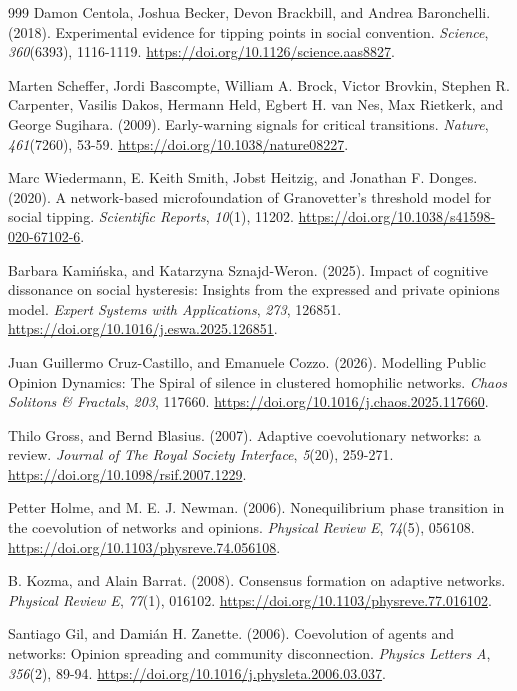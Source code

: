 \documentclass[10pt,a4paper]{article}
\begin{document}
\begin{thebibliography}{999}
Damon Centola, Joshua Becker, Devon Brackbill, and Andrea Baronchelli. (2018). Experimental evidence for tipping points in social convention. \textit{Science}, \textit{360}(6393), 1116-1119. \url{https://doi.org/10.1126/science.aas8827}.

Marten Scheffer, Jordi Bascompte, William A. Brock, Victor Brovkin, Stephen R. Carpenter, Vasilis Dakos, Hermann Held, Egbert H. van Nes, Max Rietkerk, and George Sugihara. (2009). Early-warning signals for critical transitions. \textit{Nature}, \textit{461}(7260), 53-59. \url{https://doi.org/10.1038/nature08227}.

Marc Wiedermann, E. Keith Smith, Jobst Heitzig, and Jonathan F. Donges. (2020). A network-based microfoundation of Granovetter's threshold model for social tipping. \textit{Scientific Reports}, \textit{10}(1), 11202. \url{https://doi.org/10.1038/s41598-020-67102-6}.

Barbara Kami\'{n}ska, and Katarzyna Sznajd-Weron. (2025). Impact of cognitive dissonance on social hysteresis: Insights from the expressed and private opinions model. \textit{Expert Systems with Applications}, \textit{273}, 126851. \url{https://doi.org/10.1016/j.eswa.2025.126851}.

Juan Guillermo Cruz-Castillo, and Emanuele Cozzo. (2026). Modelling Public Opinion Dynamics: The Spiral of silence in clustered homophilic networks. \textit{Chaos Solitons \& Fractals}, \textit{203}, 117660. \url{https://doi.org/10.1016/j.chaos.2025.117660}.

Thilo Gross, and Bernd Blasius. (2007). Adaptive coevolutionary networks: a review. \textit{Journal of The Royal Society Interface}, \textit{5}(20), 259-271. \url{https://doi.org/10.1098/rsif.2007.1229}.

Petter Holme, and M. E. J. Newman. (2006). Nonequilibrium phase transition in the coevolution of networks and opinions. \textit{Physical Review E}, \textit{74}(5), 056108. \url{https://doi.org/10.1103/physreve.74.056108}.

B. Kozma, and Alain Barrat. (2008). Consensus formation on adaptive networks. \textit{Physical Review E}, \textit{77}(1), 016102. \url{https://doi.org/10.1103/physreve.77.016102}.

Santiago Gil, and Dami\'{a}n H. Zanette. (2006). Coevolution of agents and networks: Opinion spreading and community disconnection. \textit{Physics Letters A}, \textit{356}(2), 89-94. \url{https://doi.org/10.1016/j.physleta.2006.03.037}.


\end{thebibliography}
\end{document}
